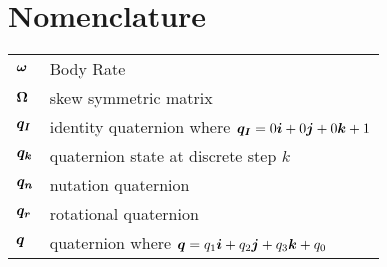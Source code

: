 \vspace*{0.5in}
    \thispagestyle{plain}
    \chapter*{Nomenclature}

\begin{tabular}{ll}
  $\boldsymbol{\omega}$ & Body Rate \\
  $\boldsymbol{\Omega}$ & skew symmetric matrix \\
  $\boldsymbol{q_I}$ & identity quaternion where $\boldsymbol{q_I} = 0\boldsymbol{i}+0\boldsymbol{j}+0\boldsymbol{k}+1$ \\
  $\boldsymbol{q_k}$ & quaternion state at discrete step $k$ \\
  $\boldsymbol{q_n}$ & nutation quaternion \\
  $\boldsymbol{q_r}$ & rotational quaternion \\
  $\boldsymbol{q}$ & quaternion where $\boldsymbol{q} = q_1\boldsymbol{i}+q_2\boldsymbol{j}+q_3\boldsymbol{k}+q_0$ \\
\end{tabular}





